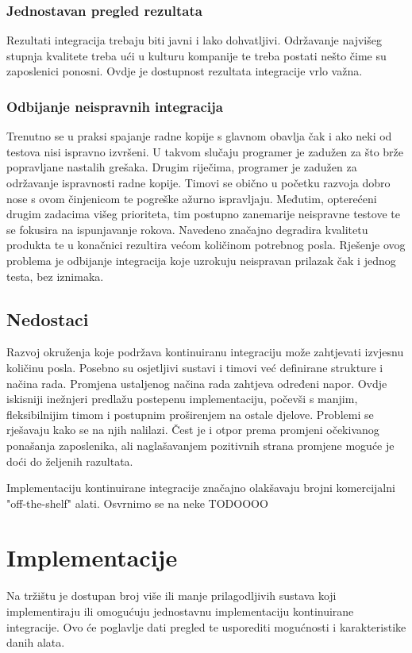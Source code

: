 \documentclass[times, utf8, seminar, numeric]{fer}
\begin{document}
\subsection{Jednostavan pregled rezultata}
Rezultati integracija trebaju biti javni i lako dohvatljivi. Održavanje najvišeg stupnja kvalitete treba ući u kulturu kompanije te treba postati nešto čime su zaposlenici ponosni. Ovdje je dostupnost rezultata integracije vrlo važna.

\subsection{Odbijanje neispravnih integracija}
Trenutno se u praksi spajanje radne kopije s glavnom obavlja čak i ako neki od testova nisi ispravno izvršeni. U takvom slučaju programer je zadužen za što brže popravljane nastalih grešaka. Drugim riječima, programer je zadužen za održavanje ispravnosti radne kopije. Timovi se obično u početku razvoja dobro nose s ovom činjenicom te pogreške ažurno ispravljaju. Međutim, opterećeni drugim zadacima višeg prioriteta, tim postupno zanemarije  neispravne testove te se fokusira na ispunjavanje rokova\citep{web:CIDoesNotWork}. Navedeno značajno degradira kvalitetu produkta te u konačnici rezultira većom količinom potrebnog posla. Rješenje ovog problema je odbijanje integracija koje uzrokuju neispravan prilazak čak i jednog testa, bez iznimaka\citep{web:CIDead}.

\section{Nedostaci}
Razvoj okruženja koje podržava kontinuiranu integraciju može zahtjevati izvjesnu količinu posla. Posebno su osjetljivi sustavi i timovi već definirane strukture i načina rada. Promjena ustaljenog načina rada zahtjeva određeni napor. Ovdje iskisniji inežnjeri predlažu postepenu implementaciju, počevši s manjim, fleksibilnijim timom i postupnim proširenjem na ostale djelove. Problemi se rješavaju kako se na njih nalilazi. Čest je i otpor prema promjeni očekivanog ponašanja zaposlenika, ali naglašavanjem pozitivnih strana promjene moguće je doći do željenih razultata.

Implementaciju kontinuirane integracije značajno olakšavaju brojni komercijalni "off-the-shelf" alati. Osvrnimo se na neke TODOOOO


\chapter{Implementacije}
Na tržištu je dostupan broj više ili manje prilagodljivih sustava koji implementiraju ili omogućuju jednostavnu implementaciju kontinuirane integracije. Ovo će poglavlje dati pregled te usporediti mogućnosti i karakteristike danih alata.
\end{document}
